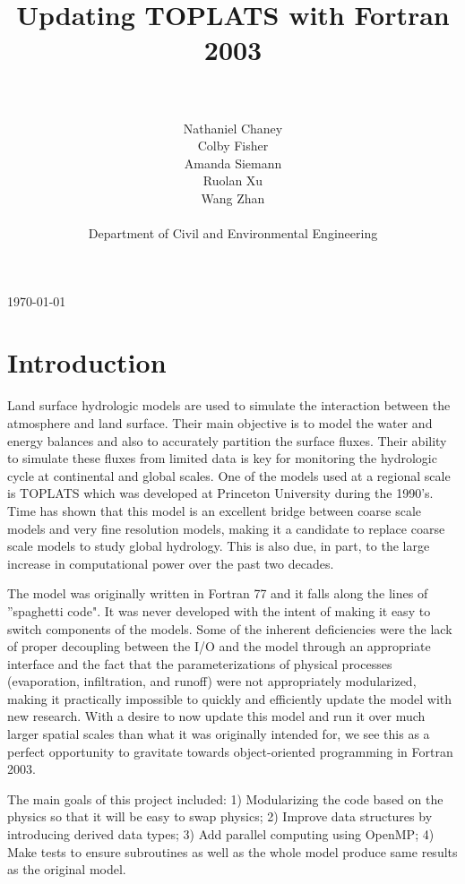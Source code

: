 \documentclass[pdftex,12pt,a4paper]{article}
\title{Updating TOPLATS with Fortran 2003}
\author{\\ \\ Nathaniel Chaney\\ Colby Fisher\\ Amanda Siemann\\ Ruolan Xu\\ Wang Zhan \\ \\ Department of Civil and Environmental Engineering}
\date{}
\begin{document}
\maketitle
\vfill
\begin{center}
{\large \today}
\end{center}

\section{Introduction}
Land surface hydrologic models are used to simulate the interaction between the atmosphere and land surface. Their main objective is to model the water and energy balances and also to accurately partition the surface fluxes. Their ability to simulate these fluxes from limited data is key for monitoring the hydrologic cycle at continental and global scales. One of the models used at a regional scale is TOPLATS which was developed at Princeton University during the 1990's. Time has shown that this model is an excellent bridge between coarse scale models and very fine resolution models, making it a candidate to replace coarse scale models to study global hydrology. This is also due, in part, to the large increase in computational power over the past two decades. 

The model was originally written in Fortran 77 and it falls along the lines of ''spaghetti code". It was never developed with the intent of making it easy to switch components of the models. Some of the inherent deficiencies were the lack of proper decoupling between the I/O and the model through an appropriate interface and the fact that the parameterizations of physical processes (evaporation, infiltration, and runoff) were not appropriately modularized, making it practically impossible to quickly and efficiently update the model with new research. With a desire to now update this model and run it over much larger spatial scales than what it was originally intended for, we see this as a perfect opportunity to gravitate towards object-oriented programming in Fortran 2003. 

The main goals of this project included: 1) Modularizing the code based on the physics so that it will be easy to swap physics; 2) Improve data structures by introducing derived data types; 3) Add parallel computing using OpenMP; 4) Make tests to ensure subroutines as well as the whole model produce same results as the original model. 

\newpage
\end{document}
